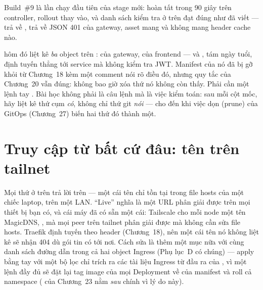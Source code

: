 Build~\#9 là lần chạy đầu tiên của stage mới: 
hoàn tất trong 90 giây trên controller, rollout thay
 vào, và danh sách kiểm tra ở trên đạt đúng
như đã viết ---  trả về ,
 trả về JSON 401 của gateway, asset mang
 và \code{/} không mang header cache nào.

\begin{pitfall}
 hôm đó liệt kê \emph{ba} object trên
: của gateway, của frontend --- và
, tám ngày tuổi, định tuyến  thẳng
tới service mà không kiểm tra JWT. Manifest của nó đã bị gỡ khỏi
 từ Chương~18 kèm một comment nói rõ điều
đó, nhưng quy tắc của Chương~20 vẫn đúng:  không bao giờ
xóa thứ nó không còn thấy. Phải cần một lệnh tay
. Bài học không phải
là câu lệnh mà là việc kiểm toán: sau mỗi cột mốc, hãy liệt kê thứ
cụm \emph{có}, không chỉ thứ git \emph{nói} --- cho đến khi việc dọn
(prune) của GitOps (Chương~27) biến hai thứ đó thành một.
\end{pitfall}

\section{Truy cập từ bất cứ đâu: tên trên tailnet}

Mọi thứ ở trên trả lời trên  --- một cái tên chỉ tồn
tại trong file hosts của một chiếc laptop, trên một LAN. ``Live''
nghĩa là một URL phân giải được trên mọi thiết bị bạn có, và cái máy
đã có sẵn một cái: Tailscale cho mỗi node một tên MagicDNS,
, mà mọi peer trên tailnet phân
giải được mà không cần sửa file hosts. Traefik định tuyến theo header
 (Chương~18), nên một cái tên nó không liệt kê sẽ nhận 404
dù gói tin có tới nơi. Cách sửa là thêm một mục  nữa với
cùng danh sách đường dẫn trong cả hai object Ingress (Phụ lục~D có
chúng) --- apply bằng tay với một bộ lọc chỉ trích ra các tài liệu
Ingress từ đầu ra của , vì một lệnh
 đầy đủ sẽ đặt lại tag image của mọi Deployment về
 của manifest và roll cả namespace ( của Chương~23 nằm \emph{sau}  chính vì lý do này).


